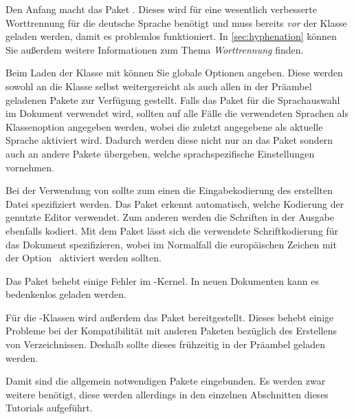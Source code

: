 \documentclass[%
  english,ngerman,%
  geometry=no,DIV=12,automark,%
]{tudscrartcl}
\begin{document}
Den Anfang macht das Paket . Dieses wird für eine wesentlich 
verbesserte Worttrennung für die deutsche Sprache benötigt und muss bereits 
\emph{vor} der Klasse geladen werden, damit es problemlos funktioniert. In 
\autoref{sec:hyphenation} können Sie außerdem weitere Informationen zum Thema 
\emph{Worttrennung} finden.
%
\begin{Preamble}
\RequirePackage[ngerman=ngerman-x-latest]{hyphsubst}
\end{Preamble}
%
Beim Laden der Klasse mit  können Sie globale Optionen 
angeben. Diese werden sowohl an die Klasse selbst weitergereicht als auch allen 
in der Präambel geladenen Pakete zur Verfügung gestellt. Falls das Paket 
 für die Sprachauswahl im Dokument verwendet wird, sollten auf 
alle Fälle die verwendeten Sprachen als Klassenoption angegeben werden, wobei 
die zuletzt angegebene als aktuelle Sprache aktiviert wird. Dadurch werden 
diese nicht nur an das Paket  sondern auch an andere Pakete 
übergeben, welche sprachspezifische Einstellungen vornehmen.
%
%
Bei der Verwendung von  sollte zum einen die Eingabekodierung 
des erstellten Datei spezifiziert werden. Das Paket  erkennt 
automatisch, welche Kodierung der genutzte Editor verwendet. Zum anderen werden 
die Schriften in der Ausgabe ebenfalls kodiert. Mit dem Paket  
lässt sich die verwendete Schriftkodierung für das Dokument spezifizieren, 
wobei im Normalfall die europäischen Zeichen mit der Option~ 
aktiviert werden sollten.
%
\begin{Preamble}
\usepackage{selinput}
\usepackage[T1]{fontenc}
\end{Preamble}
%
Das Paket  behebt einige Fehler im -Kernel. 
In neuen Dokumenten kann es bedenkenlos geladen werden.
%
\begin{Preamble}
\usepackage{fixltx2e}
\end{Preamble}
%
Für die \KOMAScript-Klassen wird außerdem das Paket  
bereitgestellt. Dieses behebt einige Probleme bei der Kompatibilität mit 
anderen Paketen bezüglich des Erstellens von Verzeichnissen. Deshalb sollte 
dieses frühzeitig in der Präambel geladen werden. 
%
\begin{Preamble}
\usepackage{scrhack}
\end{Preamble}
%
Damit sind die allgemein notwendigen Pakete eingebunden. Es werden zwar weitere 
benötigt, diese werden allerdings in den einzelnen Abschnitten dieses Tutorials 
aufgeführt.
\end{document}
